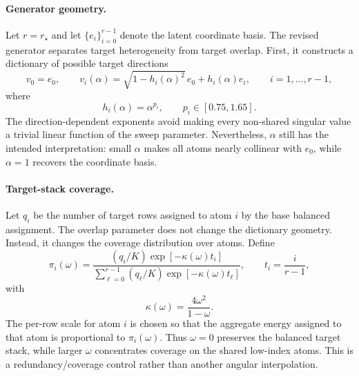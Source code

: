 
\paragraph{Generator geometry.}
Let $r=r_\star$ and let $\{e_i\}_{i=0}^{r-1}$ denote the latent coordinate
basis.  The revised generator separates target heterogeneity from target
overlap.  First, it constructs a dictionary of possible target directions
\[
    v_0=e_0,\qquad
    v_i(\alpha)
    =
    \sqrt{1-h_i(\alpha)^2}\,e_0+h_i(\alpha)e_i,
    \qquad i=1,\ldots,r-1,
\]
where
\[
    h_i(\alpha)=\alpha^{p_i},
    \qquad
    p_i\in[0.75,1.65].
\]
The direction-dependent exponents avoid making every non-shared singular value a
trivial linear function of the sweep parameter.  Nevertheless, $\alpha$ still
has the intended interpretation: small $\alpha$ makes all atoms nearly
collinear with $e_0$, while $\alpha=1$ recovers the coordinate basis.

\paragraph{Target-stack coverage.}
Let $q_i$ be the number of target rows assigned to atom $i$ by the base balanced
assignment.  The overlap parameter does not change the dictionary geometry.
Instead, it changes the coverage distribution over atoms.  Define
\[
    \pi_i(\omega)
    =
    \frac{(q_i/K)\exp[-\kappa(\omega)t_i]}
         {\sum_{\ell=0}^{r-1}(q_\ell/K)\exp[-\kappa(\omega)t_\ell]},
    \qquad
    t_i=\frac{i}{r-1},
\]
with
\[
    \kappa(\omega)=\frac{4\omega^2}{1-\omega}.
\]
The per-row scale for atom $i$ is chosen so that the aggregate energy assigned
to that atom is proportional to $\pi_i(\omega)$.  Thus $\omega=0$ preserves the
balanced target stack, while larger $\omega$ concentrates coverage on the shared
low-index atoms.  This is a redundancy/coverage control rather than another
angular interpolation.

